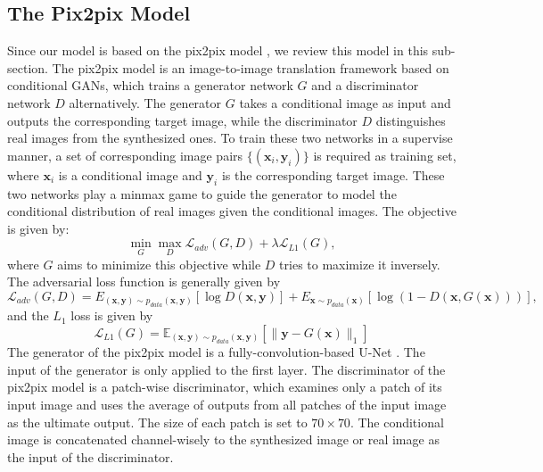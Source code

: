 \subsection{The Pix2pix Model}
\label{subsec:pix2pix}
Since our model is based on the pix2pix model \cite{pix2pix}, we review this model in this sub-section. The pix2pix model is an image-to-image translation framework based on conditional GANs, which trains a generator network $G$ and a discriminator network $D$ alternatively. The generator $G$ takes a conditional image as input and outputs the corresponding target image, while the discriminator $D$ distinguishes real images from the synthesized ones. To train these two networks in a supervise manner, a set of corresponding image pairs $\{(\bm{x}_i, \bm{y}_i)\}$ is required as training set, where $\bm{x}_i$ is a conditional image and $\bm{y}_i$ is the corresponding target image. These two networks play a minmax game to guide the generator to model the conditional distribution of real images given the conditional images. The objective is given by:
\begin{equation}
\label{eqn:minmax_game}
\min_G \max_D \mathcal{L}_{adv}(G,D)+\lambda \mathcal{L}_{L1}(G),
\end{equation}
where $G$ aims to minimize this objective while $D$ tries to maximize it inversely.
The adversarial loss function is generally given by 
\begin{equation}
\label{eqn:loss_adv}
\mathcal{L}_{adv}(G,D)=E_{(\bm{x},\bm{y})\sim p_{data}(\bm{x},\bm{y})}[\log D(\bm{x},\bm{y})]+E_{\bm{x}\sim p_{data}(\bm{x})}[\log(1-D(\bm{x},G(\bm{x})))],
\end{equation}
and the $L_1$ loss is given by
\begin{equation}
\label{eqn:loss_l1}
\mathcal{L}_{L1}(G)=\mathbb{E}_{(\bm{x},\bm{y})\sim p_{data}(\bm{x},\bm{y})}[\|\bm{y}-G(\bm{x})\|_1]
\end{equation}
The generator of the pix2pix model is a fully-convolution-based U-Net \cite{Unet}. The input of the generator is only applied to the first layer. The discriminator of the pix2pix model is a patch-wise discriminator, which examines only a patch of its input image and uses the average of outputs from all patches of the input image as the ultimate output. The size of each patch is set to $70\times 70$. The conditional image is concatenated channel-wisely to the synthesized image or real image as the input of the discriminator. 

